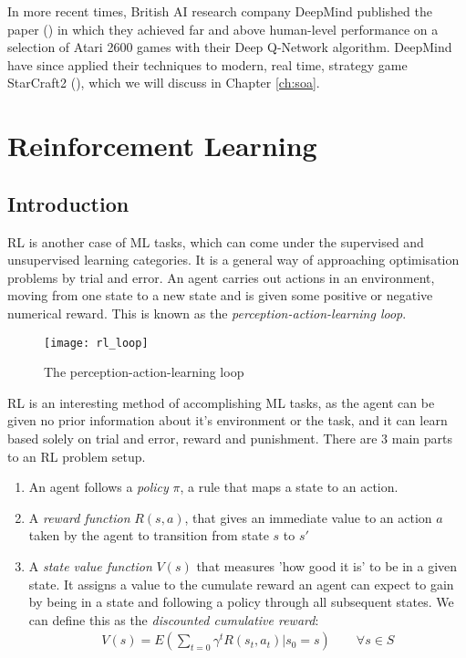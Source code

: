 In more recent times, British AI research company DeepMind published the paper (\citet{deepmind1}) in which they achieved far and above
human-level performance on a selection of Atari 2600 games with their Deep Q-Network algorithm.
DeepMind have since applied their techniques to modern, real time, strategy game StarCraft2
(\citet{starcraft}), which we will discuss in Chapter \ref{ch:soa}.

\section{Reinforcement Learning}
\subsection{Introduction}
RL is another case of ML tasks, which can come under the supervised and unsupervised learning
categories. It is a general way of approaching optimisation problems by trial and error. An agent
carries out actions in an environment, moving from one state to a new state and is given some
positive or negative numerical reward. This is known as the \textit{perception-action-learning
    loop}.

\begin{figure}[h]
    \texttt{[image: rl\_loop]}
    \centering
    \caption{The perception-action-learning loop}
\end{figure}

RL is an interesting method of accomplishing ML tasks, as the agent can be given no prior
information about it's environment or the task, and it can learn based solely on trial and error,
reward and punishment. There are 3 main parts to an RL problem setup.

\begin{enumerate}
    \item An agent follows a \textit{policy} $\pi$, a rule that maps a state to an action.
    \item A \textit{reward function} $R(s, a)$, that gives an immediate value to an action $a$ taken
          by the agent to transition from state $s$ to $s'$
    \item A \textit{state value function} $V(s)$ that measures 'how good it is' to be in a given
          state. It assigns a value to the cumulate reward an agent can expect to gain by being in a
          state and following a policy through all subsequent states. We can define this as the
          \textit{discounted cumulative reward}:
          \begin{align}
              V(s) = E(\sum_{t=0}\gamma^tR(s_t, a_t) | s_0 = s) \qquad \forall s \in S
          \end{align}
\end{enumerate}

